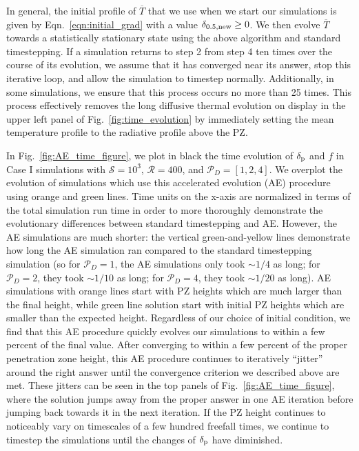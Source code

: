 \documentclass[twocolumn]{aastex631}
\newcommand{\delp}{\ensuremath{\delta_{\rm{p}}}}
\newcommand{\mP}{\ensuremath{\mathcal{P}}}
\newcommand{\mR}{\ensuremath{\mathcal{R}}}
\newcommand{\mS}{\ensuremath{\mathcal{S}}}
\renewcommand{\bar}[1]{\overline{#1}}
\begin{document}
In general, the initial profile of $\bar{T}$ that we use when we start our simulations is given by Eqn.~\ref{eqn:initial_grad} with a value $\delta_{0.5,\rm{new}} \geq 0$.
We then evolve $\bar{T}$ towards a statistically stationary state using the above algorithm and standard timestepping.
If a simulation returns to step 2 from step 4 ten times over the course of its evolution, we assume that it has converged near its answer, stop this iterative loop, and allow the simulation to timestep normally.
Additionally, in some simulations, we ensure that this process occurs no more than 25 times.
This process effectively removes the long diffusive thermal evolution on display in the upper left panel of Fig.~\ref{fig:time_evolution} by immediately setting the mean temperature profile to the radiative profile above the PZ.

In Fig.~\ref{fig:AE_time_figure}, we plot in black the time evolution of $\delp$ and $f$ in Case I simulations with $\mS = 10^3$, $\mR = 400$, and $\mP_D = [1,2,4]$.
We overplot the evolution of simulations which use this accelerated evolution (AE) procedure using orange and green lines.
Time units on the x-axis are normalized in terms of the total simulation run time in order to more thoroughly demonstrate the evolutionary differences between standard timestepping and AE.
However, the AE simulations are much shorter: the vertical green-and-yellow lines demonstrate how long the AE simulation ran compared to the standard timestepping simulation (so for $\mP_D = 1$, the AE simulations only took $\sim 1/4$ as long; for $\mP_D = 2$, they took $\sim 1/10$ as long; for $\mP_D = 4$, they took $\sim 1/20$ as long).
AE simulations with orange lines start with PZ heights which are much larger than the final height, while green line solution start with initial PZ heights which are smaller than the expected height.
Regardless of our choice of initial condition, we find that this AE procedure quickly evolves our simulations to within a few percent of the final value.
After converging to within a few percent of the proper penetration zone height, this AE procedure continues to iteratively ``jitter'' around the right answer until the convergence criterion we described above are met.
These jitters can be seen in the top panels of Fig.~\ref{fig:AE_time_figure}, where the solution jumps away from the proper answer in one AE iteration before jumping back towards it in the next iteration.
If the PZ height continues to noticeably vary on timescales of a few hundred freefall times, we continue to timestep the simulations until the changes of $\delp$ have diminished.
\end{document}
